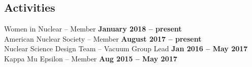 \documentclass[margin,line]{resume}
\begin{document}
\begin{resume}
    \section{\mysidestyle Activities}
    Women in Nuclear – Member \hfill \textbf{January 2018 -- present}\\
    American Nuclear Society – Member \hfill \textbf{August 2017 -- present}\\
    Nuclear Science Design Team – Vacuum Group Lead \hfill \textbf{Jan 2016 -- May 2017}\\
    Kappa Mu Epsilon – Member \hfill \textbf{Aug 2015 -- May 2017}



\end{resume}
\end{document}
